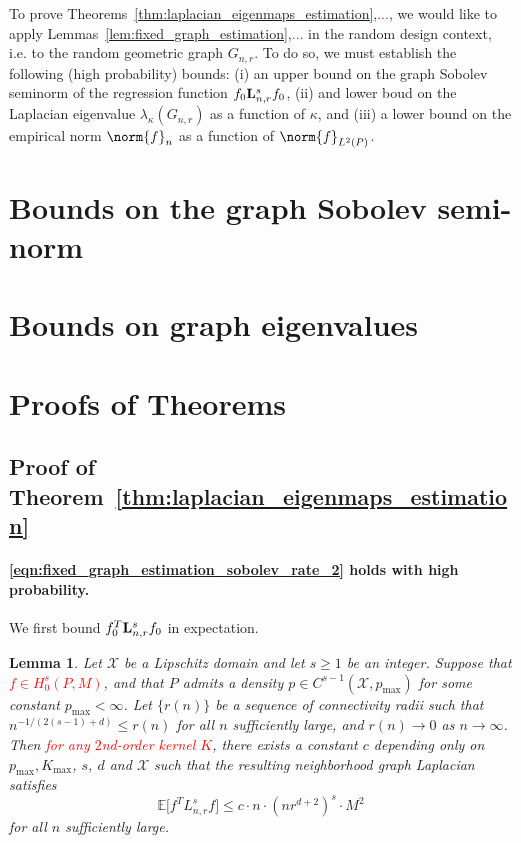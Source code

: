 \documentclass{article}
\newcommand{\1}{\mathbf{1}}
\newcommand{\Lap}{{\bf L}}
\newcommand{\Xset}{\mathcal{X}}
\newcommand{\Ebb}{\mathbb{E}}
\theoremstyle{alden}
\theoremstyle{aldenthm}
\newtheorem{lemma}{Lemma}
\theoremstyle{definition}
\theoremstyle{remark}
\begin{document}
To prove Theorems~\ref{thm:laplacian_eigenmaps_estimation},\textcolor{red}{...}, we would like to apply Lemmas~\ref{lem:fixed_graph_estimation},\textcolor{red}{...} in the random design context, i.e. to the random geometric graph $G_{n,r}$. To do so, we must establish the following (high probability) bounds: (i) an upper bound on the graph Sobolev seminorm of the regression function $f_0 \Lap_{n,r}^s f_0$, (ii) and lower boud on the Laplacian eigenvalue $\lambda_{\kappa}(G_{n,r})$ as a function of $\kappa$, and (iii) a lower bound on the empirical norm $\norm{f}_{n}$ as a function of $\norm{f}_{L^2(P)}$. 

\section{Bounds on the graph Sobolev semi-norm}

\section{Bounds on graph eigenvalues}

\section{Proofs of Theorems}
\label{sec:proofs_theorems}

\subsection{Proof of Theorem~\ref{thm:laplacian_eigenmaps_estimation}}
\label{subsec:laplacian_eigenmaps_estimation_pf}


\paragraph{\eqref{eqn:fixed_graph_estimation_sobolev_rate_2} holds with high probability.}

We first bound $f_0^T \Lap_{n,r}^s f_0$ in expectation.
\begin{lemma}
	\label{lem:roughness_functional_expectation_sobolev}
	Let $\Xset$ be a Lipschitz domain and let $s \geq 1$ be an integer. Suppose that \textcolor{red}{$f \in H_0^{s}(P,M)$}, and that $P$ admits a density $p \in C^{s-1}(\Xset,p_{\max})$ for some constant $p_{\max} < \infty$. Let $\{r(n)\}$ be a sequence of connectivity radii such that $n^{-1/(2(s - 1) + d)} \leq r(n)$ for all $n$ sufficiently large, and $r(n) \to 0$ as $n \to \infty$. Then \textcolor{red}{for any $2$nd-order kernel $K$}, there exists a constant $c$ depending only on $p_{\max}, K_{\max}$, $s$, $d$ and $\Xset$ such that the resulting neighborhood graph Laplacian satisfies
	\begin{equation}
	\label{eqn:roughness_functional_expectation_sobolev}
	\Ebb\bigl[f^T L_{n,r}^s f\bigr] \leq c \cdot n \cdot (nr^{d+2})^s \cdot M^2
	\end{equation}
	for all $n$ sufficiently large.
\end{lemma}
\end{document}
